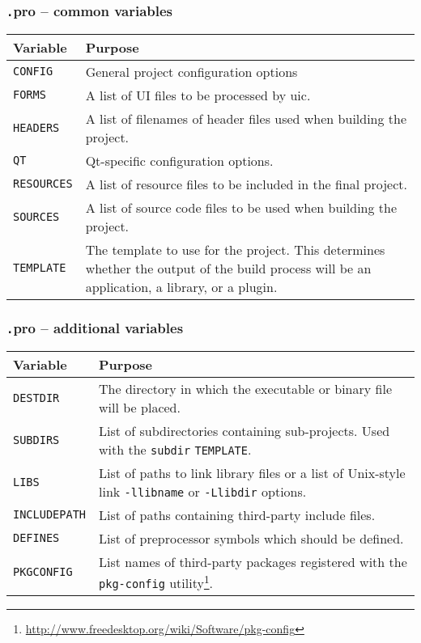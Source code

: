 \begin{frame}
  \frametitle{{\texttt .pro} -- common variables}
  \begin{center}
  \begin{tabular}{|p{}|p{}|}
    \hline
    \textbf{Variable} & \textbf{Purpose} \\
    \hline
    \texttt{CONFIG} & General project configuration options \\
    \hline
    \texttt{FORMS} & A list of UI files to be processed by uic. \\
    \hline
    \texttt{HEADERS} & A list of filenames of header files used when building the project. \\
    \hline
    \texttt{QT} & Qt-specific configuration options. \\
    \hline
    \texttt{RESOURCES} & A list of resource files to be included in the final project. \\
    \hline
    \texttt{SOURCES} & A list of source code files to be used when building the project. \\
    \hline
    \texttt{TEMPLATE} & The template to use for the project. This determines whether the output of the build process will be an application, a library, or a plugin. \\
    \hline
  \end{tabular}
  \end{center}
\end{frame}

\begin{frame}
  \frametitle{{\texttt .pro} -- additional variables}
  \begin{center}
  \begin{tabular}{|p{}|p{}|}
    \hline
    \textbf{Variable} & \textbf{Purpose} \\
    \hline
    \texttt{DESTDIR} & The directory in which the executable or binary file will be placed. \\
    \hline
    \texttt{SUBDIRS} & List of subdirectories containing sub-projects. Used
    with the \texttt{subdir} \texttt{TEMPLATE}.\\
    \hline
    \texttt{LIBS} & List of paths to link library files or a list of Unix-style
      link \texttt{-llibname} or \texttt{-Llibdir} options. \\
    \hline
    \texttt{INCLUDEPATH} & List of paths containing third-party include files. \\
    \hline
    \texttt{DEFINES} & List of preprocessor symbols which should be defined. \\
    \hline
    \texttt{PKGCONFIG} & List names of third-party packages registered with
    the \texttt{pkg-config} utility\footnote
    {\tiny\url{http://www.freedesktop.org/wiki/Software/pkg-config}}. \\
    \hline
  \end{tabular}
  \end{center}
\end{frame}

